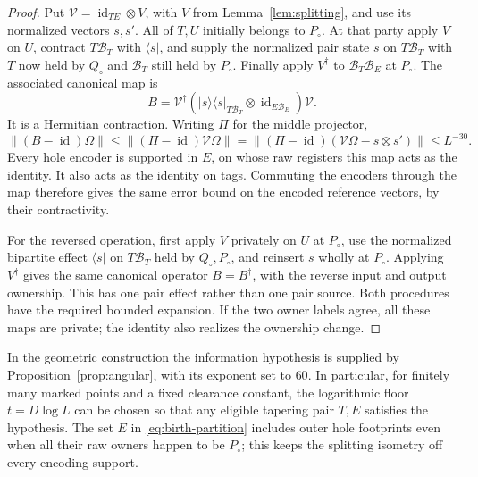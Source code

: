 \documentclass[11pt]{article}
\numberwithin{equation}{section}
\theoremstyle{definition}
\theoremstyle{remark}
\begin{document}
\begin{proof}
Put $\mathcal V=\operatorname{id}_{TE}\otimes V$, with $V$ from
Lemma~\ref{lem:splitting}, and use its normalized vectors $s,s'$.  All of
$T,U$ initially belongs to $P_\circ$.  At that party apply $V$ on $U$,
contract $T\mathcal B_T$ with $\langle s|$, and supply the normalized pair
state $s$ on $T\mathcal B_T$ with $T$ now held by $Q_\circ$ and
$\mathcal B_T$ still held by $P_\circ$.  Finally apply $V^{\dagger}$ to
$\mathcal B_T\mathcal B_E$ at $P_\circ$.  The associated canonical map is
\begin{equation}\label{eq:birth-map}
 B=\mathcal V^{\dagger}
       \left(|s\rangle\langle s|_{T\mathcal B_T}
                            \otimes\operatorname{id}_{E\mathcal B_E}\right)
          \mathcal V.
\end{equation}
It is a Hermitian contraction.  Writing $\Pi$ for the middle projector,
\[
 \lVert (B-\operatorname{id})\Omega\rVert
   \le\lVert (\Pi-\operatorname{id})\mathcal V\Omega\rVert
   =\lVert (\Pi-\operatorname{id})(\mathcal V\Omega-s\otimes s')\rVert
   \le L^{-30}.
\]
Every hole encoder is supported in $E$, on whose raw registers this map
acts as the identity.  It also acts as the identity on tags.  Commuting the
encoders through the map therefore gives the same error bound on the
encoded reference vectors, by their contractivity.

For the reversed operation, first apply $V$ privately on $U$ at
$P_\circ$, use the normalized bipartite effect $\langle s|$ on
$T\mathcal B_T$ held by $Q_\circ,P_\circ$, and reinsert $s$ wholly at
$P_\circ$.  Applying $V^{\dagger}$ gives the same canonical operator
$B=B^{\dagger}$, with the reverse input and output ownership.  This has
one pair effect rather than one pair source.  Both procedures have the
required bounded expansion.  If the two owner labels agree, all these
maps are private; the identity also realizes the ownership change.
\end{proof}

In the geometric construction the information hypothesis is supplied by
Proposition~\ref{prop:angular}, with its exponent set to $60$.  In
particular, for finitely many marked points and a fixed clearance constant,
the logarithmic floor $t=D\log L$ can be chosen so that any eligible
tapering pair $T,E$ satisfies the hypothesis.  The set $E$ in
\eqref{eq:birth-partition} includes outer hole footprints even when all
their raw owners happen to be $P_\circ$; this keeps the splitting isometry
off every encoding support.
\end{document}
